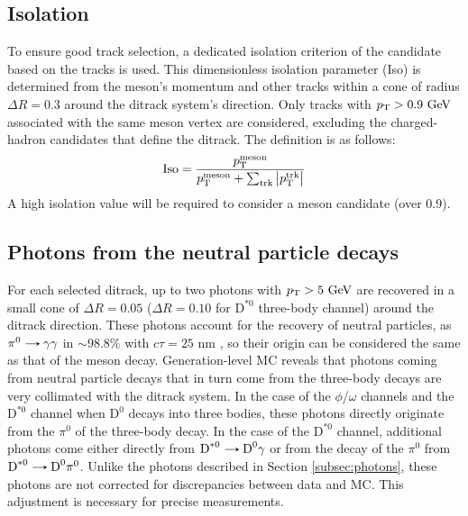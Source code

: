 \subsection{Isolation}
To ensure good track selection, a dedicated isolation criterion of the candidate based on the tracks is used. This dimensionless isolation parameter (Iso) is determined from the meson's momentum and other tracks within a cone of radius $\Delta R = 0.3$ around the ditrack system's direction. Only tracks with $p_\text{T} > 0.9\ \text{GeV}$ associated with the same meson vertex are considered, excluding the charged-hadron candidates that define the ditrack. The definition is as follows:
\begin{equation*}
    \text{Iso} = \frac{p_\text{T}^{\text{meson}}}{p_\text{T}^{\text{meson}}+\sum_{\text{trk}}{\left\lvert p_\text{T}^{\text{trk}}\right\rvert}}
\end{equation*}
A high isolation value will be required to consider a meson candidate (over 0.9).

\subsection{Photons from the neutral particle decays}\label{subsec:photons_neutral}
For each selected ditrack, up to two photons with $p_\text{T} > 5 \ \text{GeV}$ are recovered in a small cone of $\Delta R = 0.05$ ($\Delta R = 0.10$ for $\text{D}^{*0}$ three-body channel) around the ditrack direction. These photons account for the recovery of neutral particles, as $\pi^{0}\decaysto\gamma\gamma$ in $\sim 98.8\%$ with $c\tau=25$ nm \cite{PDG}, so their origin can be considered the same as that of the meson decay. Generation-level MC reveals that photons coming from neutral particle decays that in turn come from the three-body decays are very collimated with the ditrack system. In the case of the $\phi$/$\omega$ channels and the $\text{D}^{*0}$ channel when $\text{D}^{0}$ decays into three bodies, these photons directly originate from the $\pi^0$ of the three-body decay. In the case of the $\text{D}^{*0}$ channel, additional photons come either directly from $\text{D}^{*0}\decaysto \text{D}^{0}\gamma$ or from the decay of the $\pi^0$ from $\text{D}^{*0}\decaysto \text{D}^{0}\pi^0$. Unlike the photons described in Section \ref{subsec:photons}, these photons are not corrected for discrepancies between data and MC. This adjustment is necessary for precise measurements.

